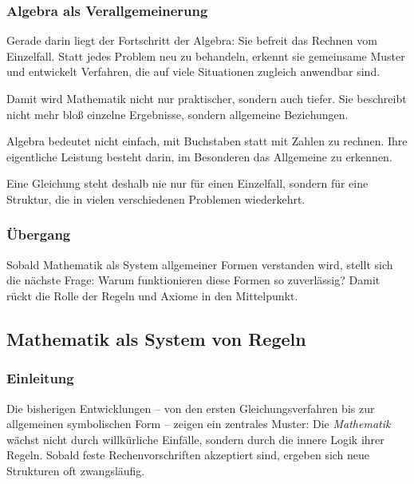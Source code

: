 \subsubsection*{Algebra als Verallgemeinerung}
Gerade darin liegt der Fortschritt der Algebra:
Sie befreit das Rechnen vom Einzelfall.
Statt jedes Problem neu zu behandeln,
erkennt sie gemeinsame Muster
und entwickelt Verfahren,
die auf viele Situationen zugleich anwendbar sind.

Damit wird Mathematik nicht nur praktischer,
sondern auch tiefer.
Sie beschreibt nicht mehr bloß einzelne Ergebnisse,
sondern allgemeine Beziehungen.

\begin{DidacticBox}
	\label{box:allgemeinform}
	Algebra bedeutet nicht einfach,
	mit Buchstaben statt mit Zahlen zu rechnen.
	Ihre eigentliche Leistung besteht darin,
	im Besonderen das Allgemeine zu erkennen.
	
	Eine Gleichung steht deshalb nie nur für einen Einzelfall,
	sondern für eine Struktur,
	die in vielen verschiedenen Problemen wiederkehrt.
\end{DidacticBox}

\subsubsection*{Übergang}
Sobald Mathematik als System allgemeiner Formen verstanden wird,
stellt sich die nächste Frage:
Warum funktionieren diese Formen so zuverlässig?
Damit rückt die Rolle der Regeln und Axiome in den Mittelpunkt.


\subsection{Mathematik als System von Regeln}
\label{sec:3.5_regelsystem}

\subsubsection*{Einleitung}
Die bisherigen Entwicklungen -- von den ersten Gleichungsverfahren
bis zur allgemeinen symbolischen Form --
zeigen ein zentrales Muster:
Die \emph{Mathematik}
wächst nicht durch willkürliche Einfälle,
sondern durch die innere Logik ihrer Regeln.
Sobald feste Rechenvorschriften akzeptiert sind,
ergeben sich neue Strukturen oft zwangsläufig.

